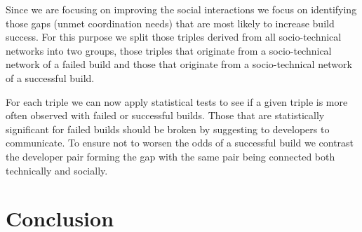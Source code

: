 Since we are focusing on improving the social interactions we focus on identifying those gaps (unmet coordination needs) that are most likely to increase build success.
For this purpose we split those triples derived from all socio-technical networks into two groups, those triples that originate from a socio-technical network of a failed build and those that originate from a socio-technical network of a successful build.

For each triple we can now apply statistical tests to see if a given triple is more often observed with failed or successful builds.
Those that are statistically significant for failed builds should be broken by suggesting to developers to communicate.
To ensure not to worsen the odds of a successful build we contrast the developer pair forming the gap with the same pair being connected both technically and socially.

\section{Conclusion}
